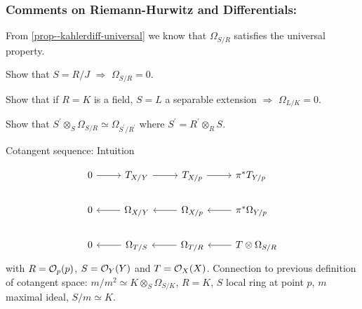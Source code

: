 \documentclass[a4paper,11pt]{article}
\begin{document}
				{\color{gray}\subsubsection*{Comments on Riemann-Hurwitz and Differentials:}

					\noindent From \autoref{prop--kahlerdiff-universal} we know that $\Omega_{S/R}$ satisfies the universal property.

					\begin{exc}
						Show that $S=R/J$ $\Longrightarrow$ $\Omega_{S/R}=0$.
					\end{exc}

					\begin{exc}
						Show that if $R=K$ is a field, $S=L$ a separable extension $\Longrightarrow$ $\Omega_{L/K}=0$.
					\end{exc}

					\begin{exc}
						Show that $S^\prime\otimes_S\Omega_{S/R}\simeq\Omega_{S^\prime/R^\prime}$ where $S^\prime=R^\prime\otimes_RS$.
					\end{exc}
				
					\noindent Cotangent sequence: Intuition
					
					\begin{center}
					\end{center}

					\begin{equation*}
						\begin{tikzcd}[/tikz/column 4/.append style={nodes={anchor=base west}}]
							0\ar[r] & T_{X/Y}\ar[r] & T_{X/p}\ar[r] & \pi^\ast T_{Y/p}\\
							0 & \Omega_{X/Y}\ar[l] & \Omega_{X/p}\ar[l] & \pi^\ast\Omega_{Y/p}\ar[l]\\
							0 & \Omega_{T/S}\ar[l] & \Omega_{T/R}\ar[l] & T\otimes\Omega_{S/R}\ar[l]
						\end{tikzcd}
					\end{equation*}
					with $R=\mathcal{O}_p(p)$, $S=\mathcal{O}_Y(Y)$ and $T=\mathcal{O}_X(X)$. Connection to previous definition of cotangent space: $m/m^2\simeq K\otimes_S\Omega_{S/K}$, $R=K$, $S$ local ring at point $p$, $m$ maximal ideal, $S/m\simeq K$.
					\\

}
\end{document}
